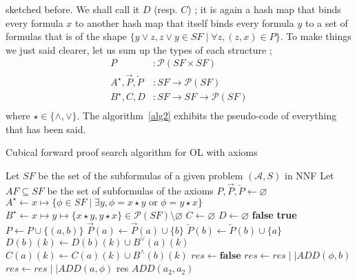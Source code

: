 \documentclass[a4paper, 11pt]{article}
\begin{document}
    sketched before. We shall call it $D$ (resp. $C$) ; it is again a hash map that binds every formula 
    $x$ to
    another hash map that itself binds every formula $y$ to a set of formulas that is of the shape
    $\{y\vee z,z\vee y\in SF\mid\forall z,(z,x)\in P\}$. To make things we just said clearer, let us sum 
    up the types of each structure ;
    \begin{align*}
	    P&:\mathcal{P}(SF\times SF)\\
	    A^\star,\overrightarrow{P},\overleftarrow{P}&:SF\rightarrow\mathcal{P}(SF)\\
	    B^\star,C,D&:SF\rightarrow SF\rightarrow\mathcal{P}(SF)\\
    \end{align*}
    where $\star\in\{\wedge,\vee\}$. The algorithm~\ref{alg2} exhibits the pseudo-code of everything 
    that has been said.
    \begin{algorithm}
	    \caption{Cubical forward proof search algorithm for OL with axioms}
	    \label{alg2}
	    \begin{algorithmic}
		\State Let $SF$ be the set of the subformulas of a given problem $(\mathcal{A},S)$ in NNF
		\State Let $AF\subseteq SF$ be the set of subformulas of the axioms
		    \State $P,\overrightarrow{P},\overleftarrow{P}\gets\varnothing$
		    \State $A^\star\gets x\mapsto\{\phi\in SF\mid\exists y,\phi=x\star y\text{ or }
		    \phi=y\star x\}$
		    \State $B^\star\gets x\mapsto y\mapsto \{x\star y,y\star x\}\in
		    \mathcal{P}(SF)\setminus\varnothing$
		\State $C\gets\varnothing$
		\State $D\gets\varnothing$
			\State\Return\textbf{false}
			\EndIf
			\State \Return \textbf{true}
			\EndIf
			\State $P\gets P\cup\{(a,b)\}$
			\State $\overrightarrow{P}(a)\gets\overrightarrow{P}(a)\cup\{b\}$
			\State $\overleftarrow{P}(b)\gets\overleftarrow{P}(b)\cup\{a\}$
			\State $D(b)(k)\gets D(b)(k)\cup B^\vee(a)(k)$
			\EndFor
			\State $C(a)(k)\gets C(a)(k)\cup B^\wedge(b)(k)$
			\EndFor	
			\State $res\gets \textbf{false}$
			\State $res\gets res\mid\mid ADD(\phi,b)$
			\EndFor
			\State $res\gets res\mid\mid ADD(a,\phi)$
			\EndFor
			\State \Return res
		\EndProcedure
		    \State $ADD(a_2,a_2)$
		    \EndFor
	    \end{algorithmic}
    \end{algorithm}
\end{document}
